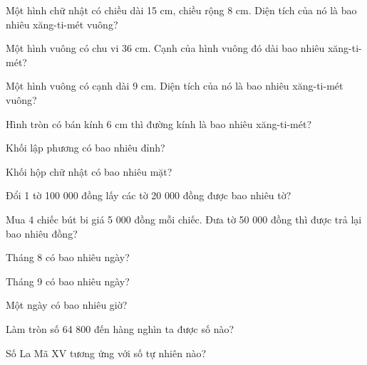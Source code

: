 \begin{ex}
Một hình chữ nhật có chiều dài 15 cm, chiều rộng 8 cm. Diện tích của nó là bao nhiêu xăng-ti-mét vuông?
\end{ex}

\begin{ex}
Một hình vuông có chu vi 36 cm. Cạnh của hình vuông đó dài bao nhiêu xăng-ti-mét?
\end{ex}

\begin{ex}
Một hình vuông có cạnh dài 9 cm. Diện tích của nó là bao nhiêu xăng-ti-mét vuông?
\end{ex}

\begin{ex}
Hình tròn có bán kính 6 cm thì đường kính là bao nhiêu xăng-ti-mét?
\end{ex}

\begin{ex}
Khối lập phương có bao nhiêu đỉnh?
\end{ex}

\begin{ex}
Khối hộp chữ nhật có bao nhiêu mặt?
\end{ex}

\begin{ex}
Đổi 1 tờ 100 000 đồng lấy các tờ 20 000 đồng được bao nhiêu tờ?
\end{ex}

\begin{ex}
Mua 4 chiếc bút bi giá 5 000 đồng mỗi chiếc. Đưa tờ 50 000 đồng thì được trả lại bao nhiêu đồng?
\end{ex}

\begin{ex}
Tháng 8 có bao nhiêu ngày?
\end{ex}

\begin{ex}
Tháng 9 có bao nhiêu ngày?
\end{ex}

\begin{ex}
Một ngày có bao nhiêu giờ?
\end{ex}

\begin{ex}
Làm tròn số 64 800 đến hàng nghìn ta được số nào?
\end{ex}

\begin{ex}
Số La Mã XV tương ứng với số tự nhiên nào?
\end{ex}
